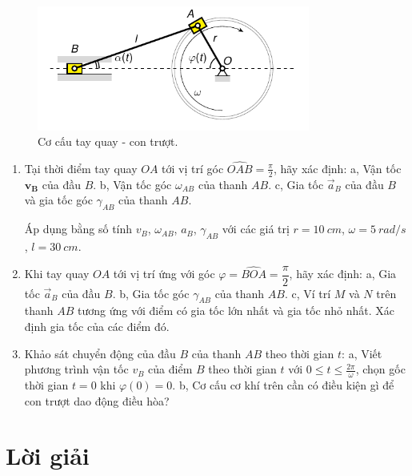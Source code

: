 \begin{figure}[!h]
    \centering
    \includegraphics[width=0.8\textwidth]{Tuan10/Figures/Slider_Crank/Slider_Crank.pdf}
    \caption{Cơ cấu tay quay - con trượt.}
    \label{fig:Slider_Crank}
\end{figure}

\begin{enumerate}
	\item Tại thời điểm tay quay \(OA\) tới vị trí góc \(\widehat{OAB}= \frac{\pi}{2}\), hãy xác định:
        \subitem a, Vận tốc \(\mathbf{v_B}\) của đầu \(B\).
        \subitem b, Vận tốc góc \(\omega_{AB}\) của thanh \(AB\).
        \subitem c, Gia tốc \(\vec{a}_B\) của đầu \(B\) và gia tốc góc \(\gamma_{AB}\) của thanh \(AB\).
        
Áp dụng bằng số tính \(v_B\), \(\omega_{AB}\), \(a_B\), \(\gamma_{AB}\) với các giá trị \(r = \SI{10}{cm}\), \(\omega = \SI{5}{rad/s}\), \(l = \SI{30}{cm}\).
    \item Khi tay quay \(OA\) tới vị trí ứng với góc \(\varphi = \widehat{BOA} = \dfrac{\pi}{2}\), hãy xác định: 
        \subitem a, Gia tốc \(\vec{a}_B\) của đầu \(B\).
        \subitem b, Gia tốc góc \(\gamma_{AB}\) của thanh \(AB\).
        \subitem c, Ví trí \(M\) và \(N\) trên thanh \(AB\) tương ứng với điểm có gia tốc lớn nhất và gia tốc nhỏ nhất. Xác định gia tốc của các điểm đó.
    \item Khảo sát chuyển động của đầu \(B\) của thanh $AB$ theo thời gian \(t\):
        \subitem a, Viết phương trình vận tốc \(v_B\) của điểm $B$ theo thời gian \(t\) với \(0 \le t \le \frac{2 \pi}{\omega}\), chọn gốc thời gian \(t = 0\) khi \(\varphi (0) = 0\).
        \subitem b, Cơ cấu cơ khí trên cần có điều kiện gì để con trượt dao động điều hòa?
\end{enumerate}




\section{Lời giải}

